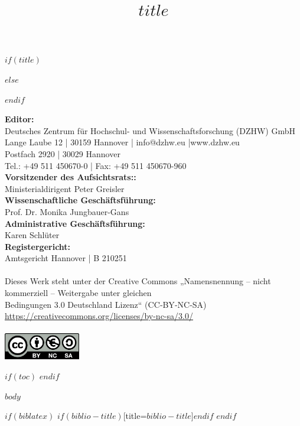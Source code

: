 \documentclass[a4paper,10pt]{article}
\begin{document}
$if(title)$
\title{$title$}
$else$
\title{}
$endif$
\date{} %
\maketitle\thispagestyle{empty}
\newpage
\thispagestyle{empty}
\null\vfill
\footnotesize
\noindent\textbf{Editor:}\\
Deutsches Zentrum für Hochschul- und Wissenschaftsforschung (DZHW) GmbH\\
Lange Laube 12 | 30159 Hannover | info@dzhw.eu |www.dzhw.eu\\
Postfach 2920 | 30029 Hannover\\
Tel.: +49 511 450670-0 | Fax: +49 511 450670-960\\
\textbf{Vorsitzender des Aufsichtsrats::}\\
Ministerialdirigent Peter Greisler\\
\textbf{Wissenschaftliche Geschäftsführung:}\\
Prof. Dr. Monika Jungbauer-Gans\\
\textbf{Administrative Geschäftsführung:}\\
Karen Schlüter\\
\textbf{Registergericht:}\\
Amtsgericht Hannover | B 210251\\
\\
Dieses Werk steht unter der Creative Commons „Namensnennung – nicht\\ kommerziell – Weitergabe unter gleichen\\
Bedingungen 3.0 Deutschland Lizenz“ (CC‐BY‐NC‐SA)\\
\href{http://www.namsu.de}{https://creativecommons.org/licenses/by-nc-sa/3.0/}\\
\\
\includegraphics[width=3.33cm]{by-nc-sa.eu.png}

$if(toc)$
\newpage
\thispagestyle{empty}
\normalsize
{
\hypersetup{linkcolor=black}
\setcounter{tocdepth}{$toc-depth$}
\tableofcontents
}
$endif$

\newpage
\clearpage
\setcounter{page}{1}
$body$

$if(biblatex)$
\newpage
\printbibliography$if(biblio-title)$[title=$biblio-title$]$endif$
$endif$
\end{document}
